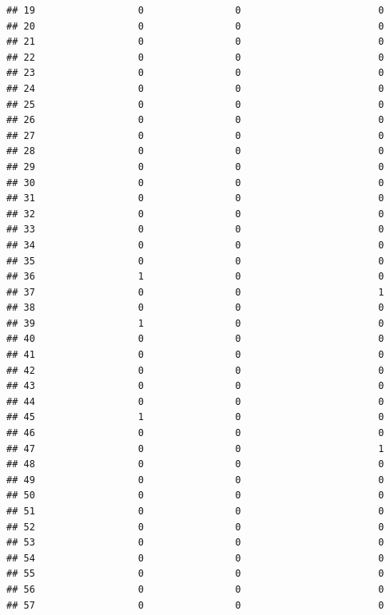 \documentclass[
]{article}
\begin{document}
\begin{verbatim}
## 19                  0                0                        0
## 20                  0                0                        0
## 21                  0                0                        0
## 22                  0                0                        0
## 23                  0                0                        0
## 24                  0                0                        0
## 25                  0                0                        0
## 26                  0                0                        0
## 27                  0                0                        0
## 28                  0                0                        0
## 29                  0                0                        0
## 30                  0                0                        0
## 31                  0                0                        0
## 32                  0                0                        0
## 33                  0                0                        0
## 34                  0                0                        0
## 35                  0                0                        0
## 36                  1                0                        0
## 37                  0                0                        1
## 38                  0                0                        0
## 39                  1                0                        0
## 40                  0                0                        0
## 41                  0                0                        0
## 42                  0                0                        0
## 43                  0                0                        0
## 44                  0                0                        0
## 45                  1                0                        0
## 46                  0                0                        0
## 47                  0                0                        1
## 48                  0                0                        0
## 49                  0                0                        0
## 50                  0                0                        0
## 51                  0                0                        0
## 52                  0                0                        0
## 53                  0                0                        0
## 54                  0                0                        0
## 55                  0                0                        0
## 56                  0                0                        0
## 57                  0                0                        0

\end{verbatim}
\end{document}
